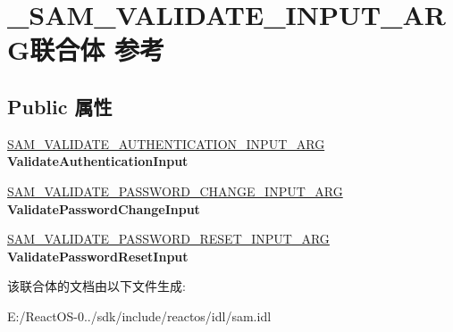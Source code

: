 \hypertarget{union___s_a_m___v_a_l_i_d_a_t_e___i_n_p_u_t___a_r_g}{}\section{\+\_\+\+S\+A\+M\+\_\+\+V\+A\+L\+I\+D\+A\+T\+E\+\_\+\+I\+N\+P\+U\+T\+\_\+\+A\+R\+G联合体 参考}
\label{union___s_a_m___v_a_l_i_d_a_t_e___i_n_p_u_t___a_r_g}
\subsection*{Public 属性}
\begin{DoxyCompactItemize}
\item 
\mbox{\label{union___s_a_m___v_a_l_i_d_a_t_e___i_n_p_u_t___a_r_g_a28f0569239fa3284ad0787d4516532c6}} 
\hyperlink{struct___s_a_m___v_a_l_i_d_a_t_e___a_u_t_h_e_n_t_i_c_a_t_i_o_n___i_n_p_u_t___a_r_g}{S\+A\+M\+\_\+\+V\+A\+L\+I\+D\+A\+T\+E\+\_\+\+A\+U\+T\+H\+E\+N\+T\+I\+C\+A\+T\+I\+O\+N\+\_\+\+I\+N\+P\+U\+T\+\_\+\+A\+RG} {\bfseries Validate\+Authentication\+Input}
\item 
\mbox{\label{union___s_a_m___v_a_l_i_d_a_t_e___i_n_p_u_t___a_r_g_a2faacc1838e2a7fe96d9026a5da103b3}} 
\hyperlink{struct___s_a_m___v_a_l_i_d_a_t_e___p_a_s_s_w_o_r_d___c_h_a_n_g_e___i_n_p_u_t___a_r_g}{S\+A\+M\+\_\+\+V\+A\+L\+I\+D\+A\+T\+E\+\_\+\+P\+A\+S\+S\+W\+O\+R\+D\+\_\+\+C\+H\+A\+N\+G\+E\+\_\+\+I\+N\+P\+U\+T\+\_\+\+A\+RG} {\bfseries Validate\+Password\+Change\+Input}
\item 
\mbox{\label{union___s_a_m___v_a_l_i_d_a_t_e___i_n_p_u_t___a_r_g_a2d63834a1334a579356437ecb77bd919}} 
\hyperlink{struct___s_a_m___v_a_l_i_d_a_t_e___p_a_s_s_w_o_r_d___r_e_s_e_t___i_n_p_u_t___a_r_g}{S\+A\+M\+\_\+\+V\+A\+L\+I\+D\+A\+T\+E\+\_\+\+P\+A\+S\+S\+W\+O\+R\+D\+\_\+\+R\+E\+S\+E\+T\+\_\+\+I\+N\+P\+U\+T\+\_\+\+A\+RG} {\bfseries Validate\+Password\+Reset\+Input}
\end{DoxyCompactItemize}


该联合体的文档由以下文件生成\+:\begin{DoxyCompactItemize}
\item 
E\+:/\+React\+O\+S-\/0../sdk/include/reactos/idl/sam.\+idl\end{DoxyCompactItemize}
